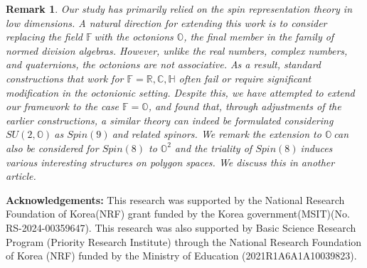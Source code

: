 \documentclass[a4paper]{article}%
\newtheorem{remark}[theorem]{Remark}
\begin{document}
\begin{remark}
Our study has primarily relied on the spin representation theory in low
dimensions. A natural direction for extending this work is to consider
replacing the field $\mathbb{F\ }$with the octonions $\mathbb{O}$, the final
member in the family of normed division algebras. However, unlike the real
numbers, complex numbers, and quaternions, the octonions are not associative.
As a result, standard constructions that work for $\mathbb{F}=\mathbb{R}%
,\mathbb{C},\mathbb{H}$ often fail or require significant modification in the
octonionic setting. Despite this, we have attempted to extend our framework to
the case $\mathbb{F}=\mathbb{O}$, and found that, through adjustments of the
earlier constructions, a similar theory can indeed be formulated considering
$SU(2,\mathbb{O})\ $as $Spin\left(  9\right)  \ $and related spinors. We
remark the extension to $\mathbb{O\ }$can also be considered for $Spin\left(
8\right)  $ to $\mathbb{O}^{2}$ and the triality of $Spin\left(  8\right)
\ $induces various interesting structures on polygon spaces. We discuss this
in another article.
\end{remark}

\textbf{Acknowledgements: }This research was supported by the National
Research Foundation of Korea(NRF) grant funded by the Korea
government(MSIT)(No. RS-2024-00359647). This research was also supported by
Basic Science Research Program (Priority Research Institute) through the
National Research Foundation of Korea (NRF) funded by the Ministry of
Education (2021R1A6A1A10039823).

\newpage
\end{document}
